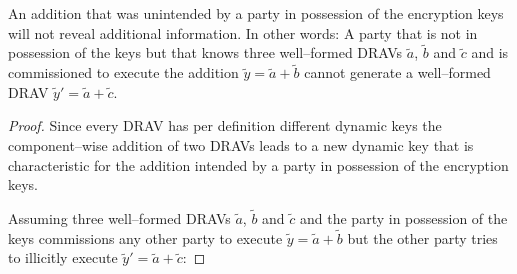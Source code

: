 \begin{lem}
  \label{lem:wrong-add}

  An addition that was unintended by a party in possession of the encryption
  keys will not reveal additional information. In other words: A party that is
  not in possession of the keys but that knows three well--formed DRAVs
  $\widetilde{a}$, $\widetilde{b}$ and $\widetilde{c}$ and is commissioned to
  execute the addition $\widetilde{y} = \widetilde{a} + \widetilde{b}$ cannot
  generate a well--formed DRAV $\widetilde{y}' = \widetilde{a} + \widetilde{c}$.

\end{lem}

\begin{proof}

  Since every DRAV has per definition different dynamic keys the
  component--wise addition of two DRAVs leads to a new dynamic key that is
  characteristic for the addition intended by a party in possession of the
  encryption keys.

  Assuming three well--formed DRAVs $\widetilde{a}$, $\widetilde{b}$ and
  $\widetilde{c}$ and the party in possession of the keys commissions any other
  party to execute $\widetilde{y} = \widetilde{a} + \widetilde{b}$ but the other
  party tries to illicitly execute $\widetilde{y}' = \widetilde{a} +
  \widetilde{c}$:


\end{proof}
